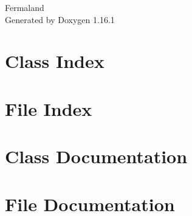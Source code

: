 \documentclass[twoside]{book}
\newcommand{\+}{\discretionary{\mbox{\scriptsize$\hookleftarrow$}}{}{}}
\newcommand{\clearemptydoublepage}{%
    \newpage{\pagestyle{empty}\cleardoublepage}%
  }
\begin{document}
  \raggedbottom
    \hypersetup{pageanchor=false,
                bookmarksnumbered=true,
                pdfencoding=unicode
               }
  \begin{titlepage}
  \vspace*{7cm}
  \begin{center}%
  {\Large Fermaland}\\
  \vspace*{1cm}
  {\large Generated by Doxygen 1.16.1}\\
  \end{center}
  \end{titlepage}
  \clearemptydoublepage
  \tableofcontents
  \clearemptydoublepage
  \hypersetup{pageanchor=true}
\chapter{Class Index}

\chapter{File Index}

\chapter{Class Documentation}

\chapter{File Documentation}




  \backmatter
  \newpage
  \clearemptydoublepage
  \printindex
\end{document}
